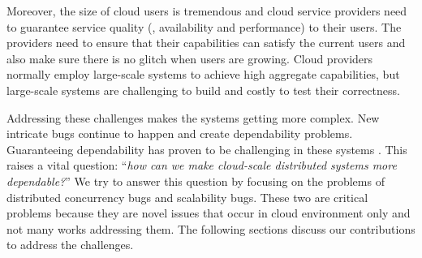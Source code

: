 Moreover, the size of cloud users is tremendous and cloud service providers need
to guarantee service quality (\ie, availability and performance) to their users.
The providers need to ensure that their capabilities can satisfy the current
users and also make sure there is no glitch when users are growing. Cloud
providers normally employ large-scale systems to achieve high aggregate
capabilities, but large-scale systems are challenging to build and costly to
test their correctness.

Addressing these challenges makes the systems getting more complex. New
intricate bugs continue to happen and create dependability problems.
Guaranteeing dependability has proven to be challenging in these systems
\cite{Gunawi+11-FateDestini, Guo+11-Demeter, Wang+14-Exalt, Yang+09-Modist}.
This raises a vital question: ``{\em how can we make cloud-scale distributed
systems more dependable?}'' We try to answer this question by
focusing on the problems of distributed concurrency bugs and scalability bugs.
These two are critical problems because they are novel issues that occur in
cloud environment only and not many works addressing them.  The following
sections discuss our contributions to address the challenges.

